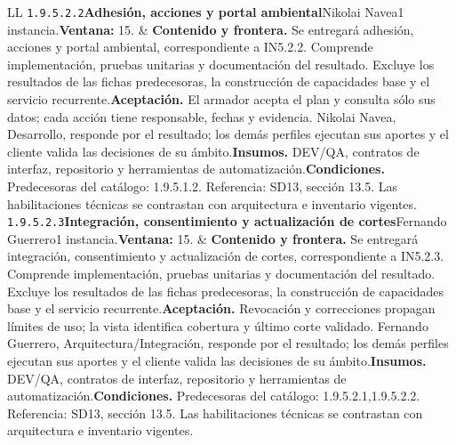 \begin{longtable}{L{\tabcolsep\relax}L{\tabcolsep\relax}}
\texttt{1.\allowbreak{}9.\allowbreak{}5.\allowbreak{}2.\allowbreak{}2}\newline{}\textbf{Adhesión, acciones y portal ambiental}\newline{}Nikolai Navea\newline{}1 instancia.\newline{}\textbf{Ventana:} 15. & \textbf{Contenido y frontera.} Se entregará adhesión, acciones y portal ambiental, correspondiente a IN5.2.2. Comprende implementación, pruebas unitarias y documentación del resultado. Excluye los resultados de las fichas predecesoras, la construcción de capacidades base y el servicio recurrente.\newline{}\textbf{Aceptación.} El armador acepta el plan y consulta sólo sus datos; cada acción tiene responsable, fechas y evidencia. Nikolai Navea, Desarrollo, responde por el resultado; los demás perfiles ejecutan sus aportes y el cliente valida las decisiones de su ámbito.\newline{}\textbf{Insumos.} DEV/QA, contratos de interfaz, repositorio y herramientas de automatización.\newline{}\textbf{Condiciones.} Predecesoras del catálogo: 1.9.5.1.2. Referencia: SD13, sección 13.5. Las habilitaciones técnicas se contrastan con arquitectura e inventario vigentes.\\\hline
\texttt{1.\allowbreak{}9.\allowbreak{}5.\allowbreak{}2.\allowbreak{}3}\newline{}\textbf{Integración, consentimiento y actualización de cortes}\newline{}Fernando Guerrero\newline{}1 instancia.\newline{}\textbf{Ventana:} 15. & \textbf{Contenido y frontera.} Se entregará integración, consentimiento y actualización de cortes, correspondiente a IN5.2.3. Comprende implementación, pruebas unitarias y documentación del resultado. Excluye los resultados de las fichas predecesoras, la construcción de capacidades base y el servicio recurrente.\newline{}\textbf{Aceptación.} Revocación y correcciones propagan límites de uso; la vista identifica cobertura y último corte validado. Fernando Guerrero, Arquitectura/Integración, responde por el resultado; los demás perfiles ejecutan sus aportes y el cliente valida las decisiones de su ámbito.\newline{}\textbf{Insumos.} DEV/QA, contratos de interfaz, repositorio y herramientas de automatización.\newline{}\textbf{Condiciones.} Predecesoras del catálogo: 1.9.5.2.1,1.9.5.2.2. Referencia: SD13, sección 13.5. Las habilitaciones técnicas se contrastan con arquitectura e inventario vigentes.\\\hline

\end{longtable}
